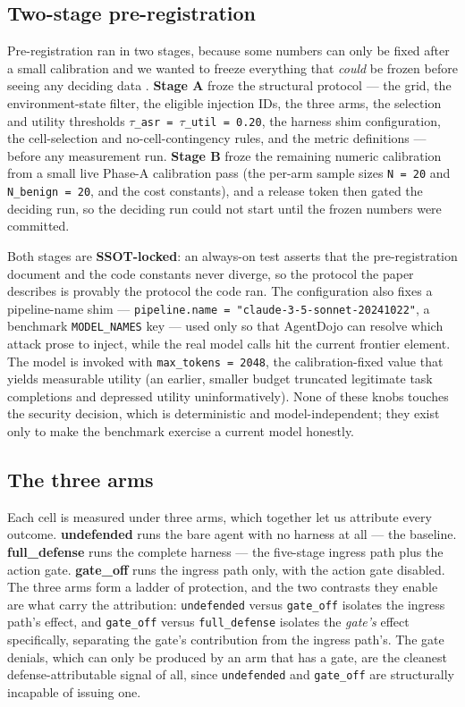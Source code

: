 \documentclass[sigconf,anonymous,review]{acmart}
\begin{document}
\subsection{Two-stage pre-registration}
Pre-registration ran in two stages, because some numbers can only be fixed after a small calibration and we wanted to freeze everything that \textit{could} be frozen before seeing any deciding data \citep{albanie-2022}. \textbf{Stage A} froze the structural protocol --- the grid, the environment-state filter, the eligible injection IDs, the three arms, the selection and utility thresholds \texttt{$\tau$\_asr = $\tau$\_util = 0.20}, the harness shim configuration, the cell-selection and no-cell-contingency rules, and the metric definitions --- before any measurement run. \textbf{Stage B} froze the remaining numeric calibration from a small live Phase-A calibration pass (the per-arm sample sizes \texttt{N = 20} and \texttt{N\_benign = 20}, and the cost constants), and a release token then gated the deciding run, so the deciding run could not start until the frozen numbers were committed.

Both stages are \textbf{SSOT-locked}: an always-on test asserts that the pre-registration document and the code constants never diverge, so the protocol the paper describes is provably the protocol the code ran. The configuration also fixes a pipeline-name shim --- \texttt{pipeline.name = "claude-3-5-sonnet-20241022"}, a benchmark \texttt{MODEL\_NAMES} key --- used only so that AgentDojo can resolve which attack prose to inject, while the real model calls hit the current frontier element. The model is invoked with \texttt{max\_tokens = 2048}, the calibration-fixed value that yields measurable utility (an earlier, smaller budget truncated legitimate task completions and depressed utility uninformatively). None of these knobs touches the security decision, which is deterministic and model-independent; they exist only to make the benchmark exercise a current model honestly.


\subsection{The three arms}
Each cell is measured under three arms, which together let us attribute every outcome. \textbf{undefended} runs the bare agent with no harness at all --- the baseline. \textbf{full\_defense} runs the complete harness --- the five-stage ingress path plus the action gate. \textbf{gate\_off} runs the ingress path only, with the action gate disabled. The three arms form a ladder of protection, and the two contrasts they enable are what carry the attribution: \texttt{undefended} versus \texttt{gate\_off} isolates the ingress path's effect, and \texttt{gate\_off} versus \texttt{full\_defense} isolates the \textit{gate's} effect specifically, separating the gate's contribution from the ingress path's. The gate denials, which can only be produced by an arm that has a gate, are the cleanest defense-attributable signal of all, since \texttt{undefended} and \texttt{gate\_off} are structurally incapable of issuing one.
\end{document}

